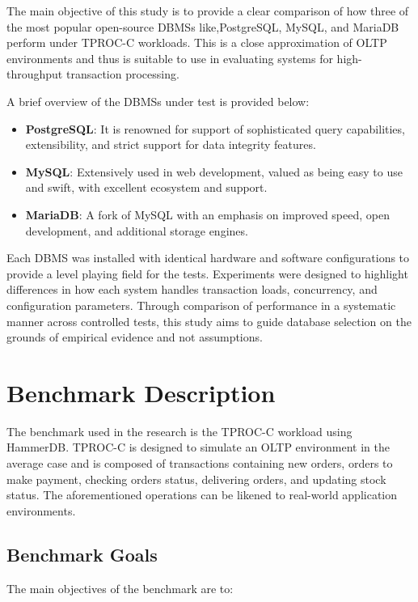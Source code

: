 The main objective of this study is to provide a clear comparison of how three of the most popular open-source DBMSs like,PostgreSQL, MySQL, and MariaDB perform under TPROC-C workloads. This is a close approximation of OLTP environments and thus is suitable to use in evaluating systems for high-throughput transaction processing.

A brief overview of the DBMSs under test is provided below:

\begin{itemize}
    \setlength\itemsep{0.1em}
    \item \textbf{PostgreSQL}: It is renowned for support of sophisticated query capabilities, extensibility, and strict support for data integrity features.
    \item \textbf{MySQL}: Extensively used in web development, valued as being easy to use and swift, with excellent ecosystem and support.
    \item \textbf{MariaDB}: A fork of MySQL with an emphasis on improved speed, open development, and additional storage engines.
\end{itemize}

Each DBMS was installed with identical hardware and software configurations to provide a level playing field for the tests. Experiments were designed to highlight differences in how each system handles transaction loads, concurrency, and configuration parameters. Through comparison of performance in a systematic manner across controlled tests, this study aims to guide database selection on the grounds of empirical evidence and not assumptions.


\section{Benchmark Description}
\label{sec:benchmark}

The benchmark used in the research is the TPROC-C workload using HammerDB. TPROC-C is designed to simulate an OLTP environment in the average case and is composed of transactions containing new orders, orders to make payment, checking orders status, delivering orders, and updating stock status. The aforementioned operations can be likened to real-world application environments.

\subsection{Benchmark Goals}

The main objectives of the benchmark are to:

